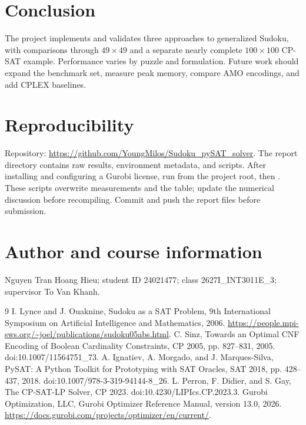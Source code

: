 \documentclass[a4paper,fleqn]{cas-sc}
\begin{document}
\section{Conclusion}
The project implements and validates three approaches to generalized Sudoku, with comparisons through \(49\times49\) and a separate nearly complete \(100\times100\) CP-SAT example. Performance varies by puzzle and formulation. Future work should expand the benchmark set, measure peak memory, compare AMO encodings, and add CPLEX baselines.

\section*{Reproducibility}
Repository: \url{https://github.com/YoungMilos/Sudoku_pySAT_solver}. The report directory contains raw results, environment metadata, and scripts. After installing  and configuring a Gurobi license, run  from the project root, then . These scripts overwrite measurements and the table; update the numerical discussion before recompiling. Commit and push the report files before submission.

\section*{Author and course information}
Nguyen Tran Hoang Hieu; student ID 24021477; class 2627I\_INT3011E\_3; supervisor To Van Khanh.

\begin{thebibliography}{9}
 I. Lynce and J. Ouaknine, Sudoku as a SAT Problem, 9th International Symposium on Artificial Intelligence and Mathematics, 2006. \url{https://people.mpi-sws.org/~joel/publications/sudoku05abs.html}.
 C. Sinz, Towards an Optimal CNF Encoding of Boolean Cardinality Constraints, CP 2005, pp. 827--831, 2005. doi:10.1007/11564751\_73.
 A. Ignatiev, A. Morgado, and J. Marques-Silva, PySAT: A Python Toolkit for Prototyping with SAT Oracles, SAT 2018, pp. 428--437, 2018. doi:10.1007/978-3-319-94144-8\_26.
 L. Perron, F. Didier, and S. Gay, The CP-SAT-LP Solver, CP 2023. doi:10.4230/LIPIcs.CP.2023.3.
 Gurobi Optimization, LLC, Gurobi Optimizer Reference Manual, version 13.0, 2026. \url{https://docs.gurobi.com/projects/optimizer/en/current/}.
\end{thebibliography}
\end{document}
